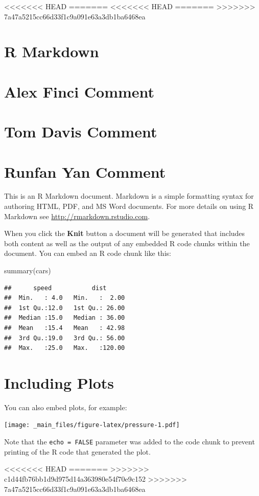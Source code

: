 \documentclass[
]{book}
\newenvironment{Shaded}{\begin{snugshade}}{\end{snugshade}}
\newcommand{\FunctionTok}[1]{\textcolor[rgb]{0.00,0.00,0.00}{#1}}
\newcommand{\NormalTok}[1]{#1}
\begin{document}
<<<<<<< HEAD
=======
<<<<<<< HEAD
=======
>>>>>>> 7a47a5215cc66d33f1c9a091e63a3db1ba6468ea
\hypertarget{r-markdown}{%
\section{R Markdown}\label{r-markdown}}

\hypertarget{alex-finci-comment}{%
\section{Alex Finci Comment}\label{alex-finci-comment}}

\hypertarget{tom-davis-comment}{%
\section{Tom Davis Comment}\label{tom-davis-comment}}

\hypertarget{runfan-yan-comment}{%
\section{Runfan Yan Comment}\label{runfan-yan-comment}}

This is an R Markdown document. Markdown is a simple formatting syntax for authoring HTML, PDF, and MS Word documents. For more details on using R Markdown see \url{http://rmarkdown.rstudio.com}.

When you click the \textbf{Knit} button a document will be generated that includes both content as well as the output of any embedded R code chunks within the document. You can embed an R code chunk like this:

\begin{Shaded}
\begin{Highlighting}[]
\FunctionTok{summary}\NormalTok{(cars)}
\end{Highlighting}
\end{Shaded}

\begin{verbatim}
##      speed           dist       
##  Min.   : 4.0   Min.   :  2.00  
##  1st Qu.:12.0   1st Qu.: 26.00  
##  Median :15.0   Median : 36.00  
##  Mean   :15.4   Mean   : 42.98  
##  3rd Qu.:19.0   3rd Qu.: 56.00  
##  Max.   :25.0   Max.   :120.00
\end{verbatim}

\hypertarget{including-plots}{%
\section{Including Plots}\label{including-plots}}

You can also embed plots, for example:

\texttt{[image: \_main\_files/figure-latex/pressure-1.pdf]}

Note that the \texttt{echo\ =\ FALSE} parameter was added to the code chunk to prevent printing of the R code that generated the plot.

<<<<<<< HEAD
=======
>>>>>>> c1d44fb76bb1d9d975d14a363980e54f70e9c152
>>>>>>> 7a47a5215cc66d33f1c9a091e63a3db1ba6468ea
  
\end{document}
